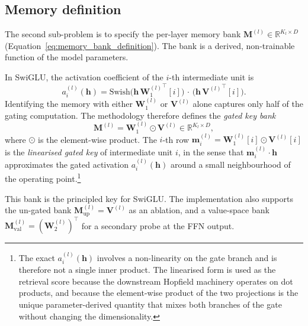 \subsection{Memory definition}
\label{subsec:memory_def}

The second sub-problem is to specify the per-layer memory bank
$\mathbf{M}^{(l)} \in \mathbb{R}^{K_l \times D}$
(Equation~\ref{eq:memory_bank_definition}). The bank is a derived,
non-trainable function of the model parameters.

In SwiGLU, the activation coefficient of the $i$-th intermediate unit is
\begin{equation}
    a_i^{(l)}(\mathbf{h})
    =
    \mathrm{Swish}\!\bigl(\mathbf{h}\,{\mathbf{W}_1^{(l)}}^{\!\top}[i]\bigr)
    \,\cdot\,
    \bigl(\mathbf{h}\,{\mathbf{V}^{(l)}}^{\!\top}[i]\bigr).
    \label{eq:swiglu_unit_activation}
\end{equation}
Identifying the memory with either $\mathbf{W}_1^{(l)}$ or $\mathbf{V}^{(l)}$ alone
captures only half of the gating computation. The methodology therefore
defines the \emph{gated key bank}
\begin{equation}
    \mathbf{M}^{(l)} = \mathbf{W}_1^{(l)} \odot \mathbf{V}^{(l)}
    \in \mathbb{R}^{K_l \times D},
    \label{eq:gated_key_bank}
\end{equation}
where $\odot$ is the element-wise product. The $i$-th row
$\mathbf{m}_i^{(l)} = \mathbf{W}_1^{(l)}[i] \odot \mathbf{V}^{(l)}[i]$ is the
\emph{linearised gated key} of intermediate unit $i$, in the sense that
$\mathbf{m}_i^{(l)} \cdot \mathbf{h}$ approximates the gated activation
$a_i^{(l)}(\mathbf{h})$ around a small neighbourhood of the operating
point.\footnote{The exact $a_i^{(l)}(\mathbf{h})$ involves a non-linearity on
the gate branch and is therefore not a single inner product. The linearised
form is used as the retrieval score because the downstream Hopfield
machinery operates on dot products, and because the element-wise product
of the two projections is the unique parameter-derived quantity that mixes
both branches of the gate without changing the dimensionality.}

This bank is the principled key for SwiGLU. The implementation also
supports the un-gated bank
$\mathbf{M}^{(l)}_{\mathrm{up}} = \mathbf{V}^{(l)}$ as an ablation, and a
value-space bank
$\mathbf{M}^{(l)}_{\mathrm{val}} = (\mathbf{W}_2^{(l)})^{\!\top}$ for a
secondary probe at the FFN output.

